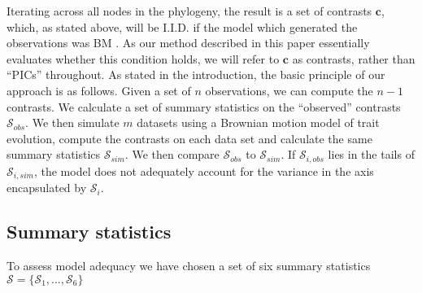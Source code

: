 \documentclass[a4paper,12pt]{article}
\begin{document}
Iterating across all nodes in the phylogeny, the result is a set of contrasts $\mathbf{c}$, which, as stated above, will be I.I.D. if the model which generated the observations was BM \citep{Felsenstein1985, Rohlf2001}. As our method described in this paper essentially evaluates whether this condition holds, we will refer to $\mathbf{c}$ as contrasts, rather than ``PICs'' throughout. As stated in the introduction, the basic principle of our approach is as follows. Given a set of $n$ observations, we can compute the $n-1$ contrasts. We calculate a set of summary statistics on the ``observed'' contrasts $\mathcal{S}_{obs}$. We then simulate $m$ datasets using a Brownian motion model of trait evolution, compute the contrasts on each data set and calculate the same summary statistics $\mathcal{S}_{sim}$. We then compare $\mathcal{S}_{obs}$ to $\mathcal{S}_{sim}$. If $\mathcal{S}_{i, obs}$ lies in the tails of $\mathcal{S}_{i, sim}$, the model does not adequately account for the variance in the axis encapsulated by $\mathcal{S}_i$.

\subsection*{Summary statistics}

To assess model adequacy we have chosen a set of six summary statistics $\mathcal{S} = \lbrace \mathcal{S}_1, \ldots, \mathcal{S}_6 \rbrace$
\end{document}
